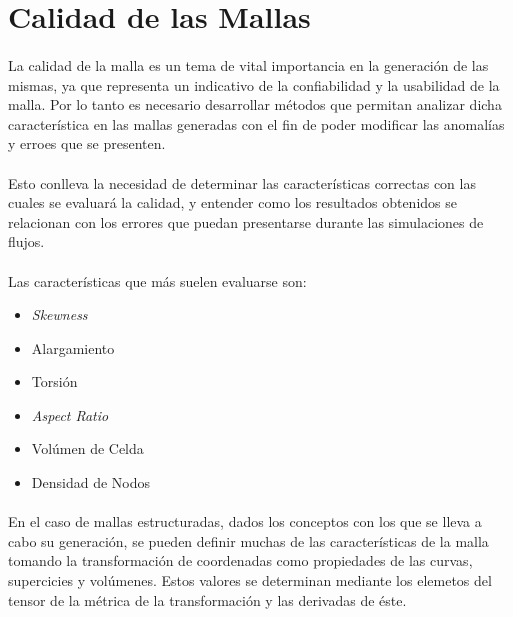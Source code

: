 \documentclass[letterpaper, openright, 12pt]{book}
\begin{document}
    \section{Calidad de las Mallas}
    \paragraph*{}
        La calidad de la malla es un tema de vital importancia en la generación
        de las mismas, ya que representa un indicativo de la confiabilidad y la
        usabilidad de la malla. Por lo tanto es necesario desarrollar métodos
        que permitan analizar dicha característica en las mallas generadas con
        el fin de poder modificar las anomalías y erroes que se presenten.

    \paragraph*{}
        Esto conlleva la necesidad de determinar las características correctas
        con las cuales se evaluará la calidad, y entender como los resultados
        obtenidos se relacionan con los errores que puedan presentarse durante
        las simulaciones de flujos.

    \paragraph*{}
        Las características que más suelen evaluarse son:
        \begin{itemize}
            \item \it{Skewness}
            \item Alargamiento
            \item Torsión
            \item \it{Aspect Ratio}
            \item Volúmen de Celda
            \item Densidad de Nodos
        \end{itemize}

    \paragraph*{}
        En el caso de mallas estructuradas, dados los conceptos con los que se
        lleva a cabo su generación, se pueden definir muchas de las
        características de la malla tomando la transformación de coordenadas
        como propiedades de las curvas, supercicies y volúmenes. Estos valores
        se determinan mediante los elemetos del tensor de la métrica de la
        transformación y las derivadas de éste. \cite{vladimir-grid}
\end{document}
